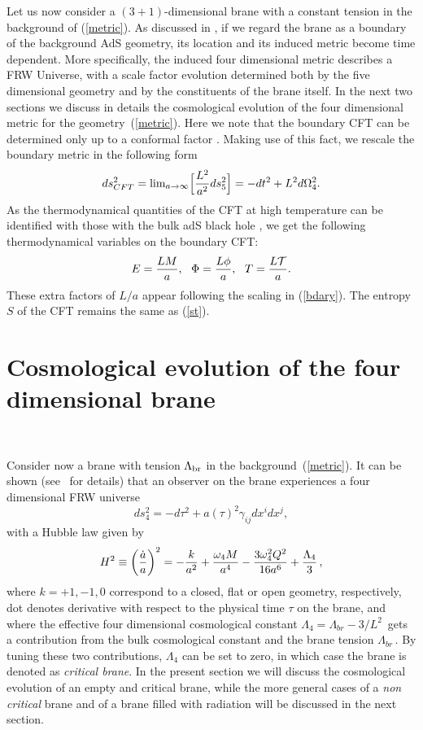 \documentclass[a4paper,11pt]{article}
\begin{document}
Let us now consider a $(3+1)$-dimensional brane with a constant tension in
the background of (\ref{metric}). As discussed in \cite{SV}, if we regard
the brane as a boundary of the background AdS geometry, its location and
its induced metric become time dependent. More specifically, the induced
four dimensional metric describes a FRW Universe, with a scale factor
evolution determined both by the five dimensional geometry and by the
constituents of the brane itself. In the next two sections we discuss in
details the cosmological evolution of the four dimensional metric for the
geometry~(\ref{metric}). Here we note that the boundary CFT can be
determined only up to a conformal factor \cite{GKP,W}. Making use of this
fact, we rescale the boundary metric in the following form
%
\begin{equation}
ds^2_{CFT} = {\rm lim}_{a \rightarrow \infty} \Big[{L^2\over{a^2}} 
ds_5^2 \Big] = -dt^2 + L^2 d\Omega_4^2.
\label{bdary}
\end{equation}
As the thermodynamical quantities of the CFT at high temperature can be 
identified with those with the bulk adS black hole \cite{witten},
we get the following thermodynamical variables on the boundary CFT:
\begin{equation}
E = {L M\over a}, ~~\Phi = {L\phi\over a}, ~~T = {L{\cal{T}}\over a}.
\label{branest}
\end{equation}
These extra factors of $L/a$ appear following the scaling in 
(\ref{bdary}). The entropy $S$ of the CFT remains the same as 
(\ref{st}).


\section{Cosmological evolution of the four dimensional brane}~\label{crit}


Consider now a brane with tension $\Lambda_{\rm br}$ in the
background~(\ref{metric}). It can be shown (see~\cite{BGG,MV,CEG,SV,GP} for
details) that an observer on the brane experiences a  four dimensional FRW
universe
%
\begin{equation}
ds_{4}^2 = -d\tau^2 + a(\tau)^2 \gamma_{ij} dx^i dx^j,
\end{equation}
%
with a Hubble law given by
%
\begin{equation}
H^2 \equiv \left( \frac{\dot{a}}{a} \right)^2 = - \frac{k}{a^2} + {\omega_{4} M\over {a^{4}}} - 
{ 3 \omega_{4}^2 Q^2\over{16 a^{6}}}+ \frac{\Lambda_4}{3} \,,
\label{freedman}
\end{equation}
%
where $k=+1,-1,0$ correspond to a closed, flat or open geometry,
respectively, dot denotes derivative with respect to the physical time
$\tau$ on the brane, and where the effective four dimensional cosmological
constant $\Lambda_4 = \Lambda_{br} - 3/L^2\,$ gets a contribution from the
bulk cosmological constant and the brane tension $\Lambda_{br}\,$. By
tuning these two contributions, $\Lambda_4$ can be set to zero, in which
case the brane is denoted as {\it critical brane}. In the present section
we will discuss the cosmological evolution of an empty and critical brane, while the more general cases of a {\it non critical} brane and of a brane filled with radiation will be discussed in the next section.
\end{document}
